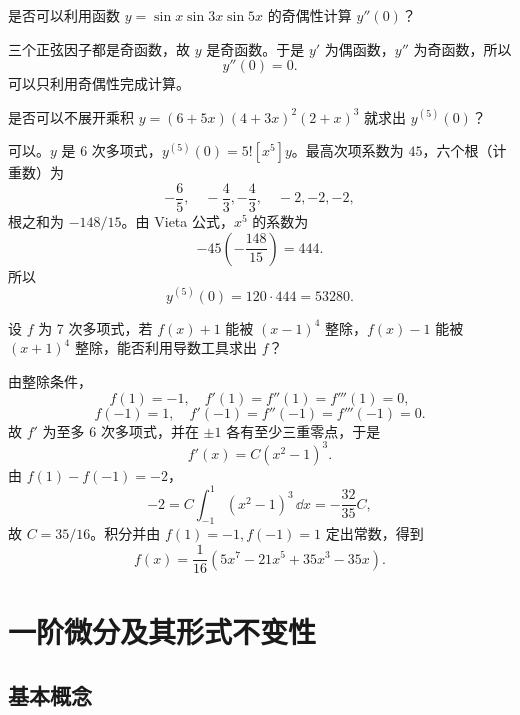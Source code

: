 \begin{xexercise}[12]
是否可以利用函数 $y=\sin x\sin3x\sin5x$ 的奇偶性计算 $y''(0)$？
\end{xexercise}
\begin{xsolution}
三个正弦因子都是奇函数，故 $y$ 是奇函数。于是 $y'$ 为偶函数，$y''$ 为奇函数，所以
\[
  \boxed{y''(0)=0}.
\]
可以只利用奇偶性完成计算。
\end{xsolution}


\begin{xexercise}[13]
是否可以不展开乘积 $y=(6+5x)(4+3x)^2(2+x)^3$ 就求出 $y^{(5)}(0)$？
\end{xexercise}
\begin{xsolution}
可以。$y$ 是 6 次多项式，$y^{(5)}(0)=5![x^5]y$。最高次项系数为 $45$，六个根（计重数）为
\[
  -\frac65,\quad-\frac43,-\frac43,\quad-2,-2,-2,
\]
根之和为 $-148/15$。由 Vieta 公式，$x^5$ 的系数为
\[
  -45\left(-\frac{148}{15}\right)=444.
\]
所以
\[
  \boxed{y^{(5)}(0)=120\cdot444=53280}.
\]
\end{xsolution}


\begin{xexercise}[14]
设 $f$ 为 7 次多项式，若 $f(x)+1$ 能被 $(x-1)^4$ 整除，$f(x)-1$ 能被 $(x+1)^4$ 整除，能否利用导数工具求出 $f$？
\end{xexercise}
\begin{xsolution}
由整除条件，
\[
  f(1)=-1,\quad f'(1)=f''(1)=f'''(1)=0,
\]
\[
  f(-1)=1,\quad f'(-1)=f''(-1)=f'''(-1)=0.
\]
故 $f'$ 为至多 6 次多项式，并在 $\pm1$ 各有至少三重零点，于是
\[
  f'(x)=C(x^2-1)^3.
\]
由 $f(1)-f(-1)=-2$，
\[
  -2=C\int_{-1}^1(x^2-1)^3\,\dd x
  =-\frac{32}{35}C,
\]
故 $C=35/16$。积分并由 $f(1)=-1,f(-1)=1$ 定出常数，得到
\[
  \boxed{f(x)=\frac1{16}(5x^7-21x^5+35x^3-35x)}.
\]
\end{xsolution}



\section{一阶微分及其形式不变性}

\subsection{基本概念}

